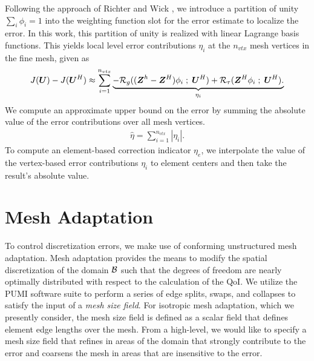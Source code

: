 Following the approach of Richter and Wick \cite{richter2015variational}, we
introduce a partition of unity $\sum_i \phi_i = 1$ into the weighting
function slot for the error estimate to localize the error. In this work,
this partition of unity is realized with linear Lagrange basis functions.
This yields local level error contributions $\eta_i$ at the $n_{vtx}$
mesh vertices in the fine mesh, given as
%
\begin{gather}
J(\boldsymbol{U}) - J(\boldsymbol{U}^H) \approx
\sum_{i=1}^{n_{vtx}}
\underbrace{
- \mathcal{R}_g ( (\boldsymbol{Z}^h - \boldsymbol{Z}^H) \phi_i \; ; \; \boldsymbol{U}^H ) +
\mathcal{R}_{\tau} ( \boldsymbol{Z}^H \phi_i \; ; \; \boldsymbol{U}^H ).
}_{\eta_i}
\label{eq:mech_error_localization}
\end{gather}
%
We compute an approximate upper bound on the error by summing the absolute
value of the error contributions over all mesh vertices.
%
\begin{gather}
\hat{\eta} = \sum_{i=1}^{n_{vtx}} | \eta_i |.
\label{eq:mech_approximated_bound}
\end{gather}
%
To compute an element-based correction indicator $\eta_e$, we interpolate the
value of the vertex-based error contributions $\eta_i$ to element centers
and then take the result's absolute value.

\section{Mesh Adaptation}

To control discretization errors, we make use of conforming unstructured
mesh adaptation. Mesh adaptation provides the means to modify the spatial
discretization of the domain $\mathcal{B}$ such that the degrees of freedom are nearly
optimally distributed with respect to the calculation of the QoI.
We utilize the PUMI \cite{ibanez2016pumi} software suite to perform a series
of edge splits, swaps, and collapses \cite{li20053d, alauzet2006parallel} to
satisfy the input of a \emph{mesh size field}. For isotropic mesh adaptation,
which we presently consider, the mesh size field is defined as a scalar field
that defines element edge lengths over the mesh. From a high-level, we would
like to specify a mesh size field that refines in areas of the domain that
strongly contribute to the error and coarsens the mesh in areas that are
insensitive to the error.

